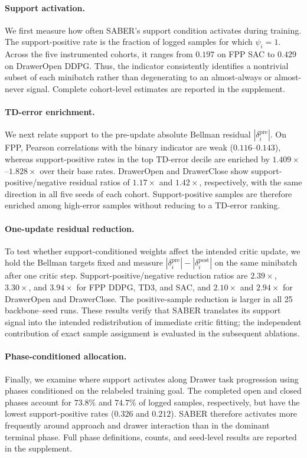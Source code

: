 \documentclass[letterpaper]{article}
\begin{document}
\paragraph{Support activation.}
We first measure how often SABER's support condition activates during training. The support-positive rate is the fraction of logged samples for which \(\psi_i=1\). Across the five instrumented cohorts, it ranges from \(0.197\) on FPP SAC to \(0.429\) on DrawerOpen DDPG. Thus, the indicator consistently identifies a nontrivial subset of each minibatch rather than degenerating to an almost-always or almost-never signal. Complete cohort-level estimates are reported in the supplement.

\paragraph{TD-error enrichment.}
We next relate support to the pre-update absolute Bellman residual \(|\delta_i^{\mathrm{pre}}|\). On FPP, Pearson correlations with the binary indicator are weak (\(0.116\)--\(0.143\)), whereas support-positive rates in the top TD-error decile are enriched by \(1.409\times\)--\(1.828\times\) over their base rates. DrawerOpen and DrawerClose show support-positive/negative residual ratios of \(1.17\times\) and \(1.42\times\), respectively, with the same direction in all five seeds of each cohort. Support-positive samples are therefore enriched among high-error samples without reducing to a TD-error ranking.

\paragraph{One-update residual reduction.}
To test whether support-conditioned weights affect the intended critic update, we hold the Bellman targets fixed and measure \(|\delta_i^{\mathrm{pre}}|-|\delta_i^{\mathrm{post}}|\) on the same minibatch after one critic step. Support-positive/negative reduction ratios are \(2.39\times\), \(3.30\times\), and \(3.94\times\) for FPP DDPG, TD3, and SAC, and \(2.10\times\) and \(2.94\times\) for DrawerOpen and DrawerClose. The positive-sample reduction is larger in all 25 backbone--seed runs. These results verify that SABER translates its support signal into the intended redistribution of immediate critic fitting; the independent contribution of exact sample assignment is evaluated in the subsequent ablations.


\paragraph{Phase-conditioned allocation.}
Finally, we examine where support activates along Drawer task progression using phases conditioned on the relabeled training goal. The completed open and closed phases account for \(73.8\%\) and \(74.7\%\) of logged samples, respectively, but have the lowest support-positive rates (\(0.326\) and \(0.212\)). SABER therefore activates more frequently around approach and drawer interaction than in the dominant terminal phase. Full phase definitions, counts, and seed-level results are reported in the supplement.
\end{document}
